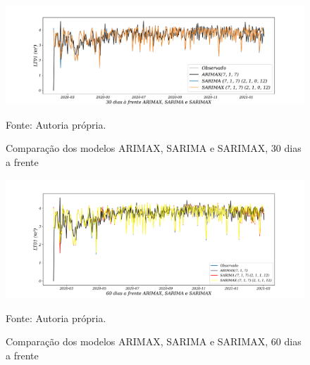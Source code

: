 \begin{figure}[H]
	\centering
	\caption{Comparação dos modelos ARIMAX, SARIMA e SARIMAX, 30 dias a frente }
	\label{fig:30-ARIMAX-SARIMA-SARIMAX24}
	\includegraphics[width=1\linewidth]{Apendices/Figuras/modelagem-24h/30-ARIMAX-SARIMA-SARIMAX}
	
	Fonte: Autoria própria.
\end{figure}

\begin{figure}[H]
	\centering
	\caption{Comparação dos modelos ARIMAX, SARIMA e SARIMAX, 60 dias a frente }
	\label{fig:60-ARIMAX-SARIMA-SARIMAX24}
	\includegraphics[width=1\linewidth]{Apendices/Figuras/modelagem-24h/60-ARIMAX-SARIMA-SARIMAX}
	
	Fonte: Autoria própria.
\end{figure}